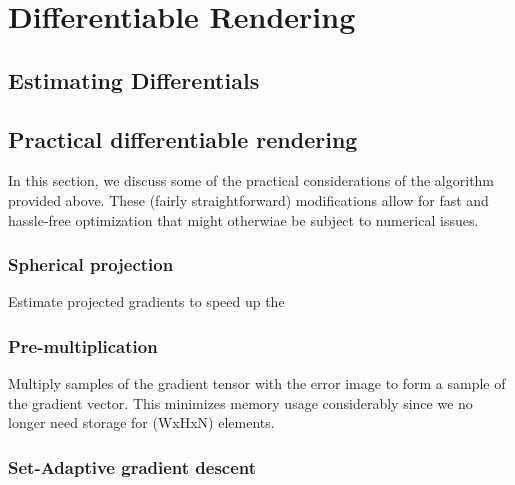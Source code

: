 \chapter{Differentiable Rendering}
\label{chapter-framework}


\section{Estimating Differentials}


\section{Practical differentiable rendering}
In this section, we discuss some of the practical considerations of the algorithm provided above.
These (fairly straightforward) modifications allow for fast and hassle-free optimization that might otherwiae be subject to numerical issues.
\subsection{Spherical projection}
Estimate projected gradients to speed up the 

\subsection{Pre-multiplication}
Multiply samples of the gradient tensor with the error image to form a sample of the gradient vector. This minimizes memory usage considerably since we no longer need storage for (WxHxN) elements.

\subsection{Set-Adaptive gradient descent}
